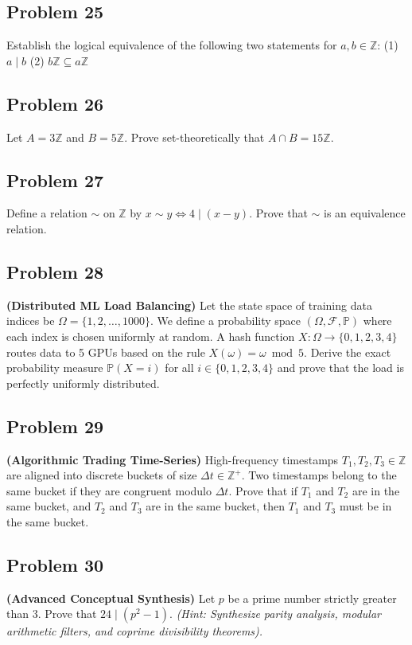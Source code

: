 \documentclass[12pt]{article}
\begin{document}
\subsection{Problem 25}
Establish the logical equivalence of the following two statements for $a, b \in \mathbb{Z}$:
(1) $a \mid b$
(2) $b \mathbb{Z} \subseteq a \mathbb{Z}$

\subsection{Problem 26}
Let $A = 3\mathbb{Z}$ and $B = 5\mathbb{Z}$. Prove set-theoretically that $A \cap B = 15\mathbb{Z}$.

\subsection{Problem 27}
Define a relation $\sim$ on $\mathbb{Z}$ by $x \sim y \iff 4 \mid (x - y)$. Prove that $\sim$ is an equivalence relation.

\subsection{Problem 28}
\textbf{(Distributed ML Load Balancing)} Let the state space of training data indices be $\Omega = \{1, 2, \dots, 1000\}$. We define a probability space $(\Omega, \mathscr{F}, \mathbb{P})$ where each index is chosen uniformly at random. A hash function $X: \Omega \to \{0, 1, 2, 3, 4\}$ routes data to 5 GPUs based on the rule $X(\omega) = \omega \bmod 5$. Derive the exact probability measure $\mathbb{P}(X = i)$ for all $i \in \{0, 1, 2, 3, 4\}$ and prove that the load is perfectly uniformly distributed.

\subsection{Problem 29}
\textbf{(Algorithmic Trading Time-Series)} High-frequency timestamps $T_1, T_2, T_3 \in \mathbb{Z}$ are aligned into discrete buckets of size $\Delta t \in \mathbb{Z}^+$. Two timestamps belong to the same bucket if they are congruent modulo $\Delta t$. Prove that if $T_1$ and $T_2$ are in the same bucket, and $T_2$ and $T_3$ are in the same bucket, then $T_1$ and $T_3$ must be in the same bucket.

\subsection{Problem 30}
\textbf{(Advanced Conceptual Synthesis)} Let $p$ be a prime number strictly greater than 3. Prove that $24 \mid (p^2 - 1)$. \textit{(Hint: Synthesize parity analysis, modular arithmetic filters, and coprime divisibility theorems).}
\end{document}
